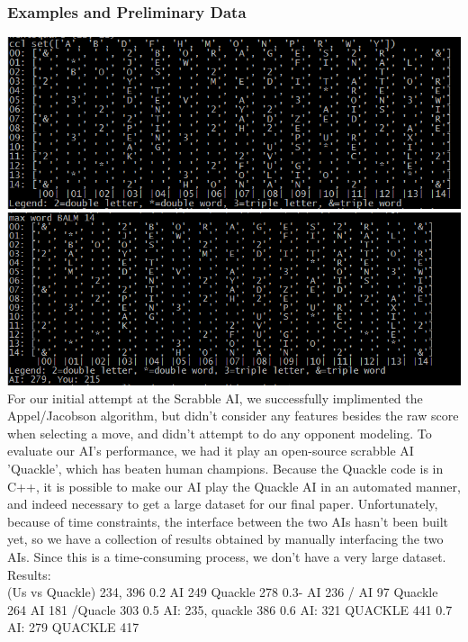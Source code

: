 \documentclass[12pt]{article}
\begin{document}
\subsubsection*{Examples and Preliminary Data}
\includegraphics{boardex1}\\
\includegraphics{boardex2}\\


For our initial attempt at the Scrabble AI, we successfully implimented the Appel/Jacobson algorithm, but didn't consider any features besides the raw score when selecting a move, and didn't attempt to do any opponent modeling.  To evaluate our AI's performance, we had it play an open-source scrabble AI 'Quackle', which has beaten human champions. Because the Quackle code is in C++, it is possible to make our AI play
the Quackle AI in an automated manner, and indeed necessary to get a large dataset for our final paper. Unfortunately, because of time constraints, the interface between the two AIs hasn't been built yet, so we have a collection of results obtained by manually interfacing the two AIs. Since this is a time-consuming process, we don't have a very large dataset. \\

Results: \\
(Us vs Quackle)
234, 396
0.2 AI 249   Quackle 278
0.3- AI 236 / AI 97 Quackle 264
 AI 181 /Quacle 303
0.5 AI: 235,  quackle 386
0.6 AI: 321  QUACKLE 441
0.7 AI: 279  QUACKLE 417
\end{document}
